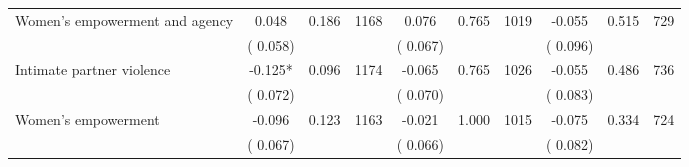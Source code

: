 \begin{tabular}{l*{9}{c}}
 Women's empowerment and agency                &              0.048        &        0.186 & 1168        &              0.076 &        0.765 & 1019               &       -0.055 &        0.515 & 729       \\ 
                               &        (       0.058) & &                                                                &       (       0.067) & &                                                         &       (       0.096) & & \\ 
 Intimate partner violence                &             -0.125*        &        0.096 & 1174        &             -0.065 &        0.765 & 1026               &       -0.055 &        0.486 & 736       \\ 
                               &        (       0.072) & &                                                                &       (       0.070) & &                                                         &       (       0.083) & & \\ 
 Women's empowerment                &             -0.096        &        0.123 & 1163        &             -0.021 &        1.000 & 1015               &       -0.075 &        0.334 & 724       \\ 
                               &        (       0.067) & &                                                                &       (       0.066) & &                                                         &       (       0.082) & & \\ 
\hline \end{tabular}                                                                                                                                                      
